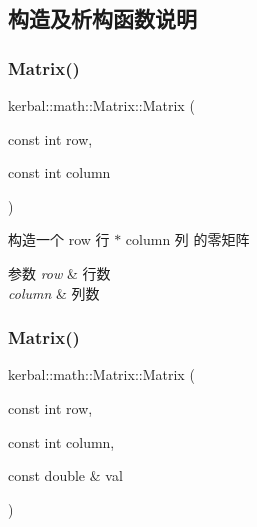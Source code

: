 \subsection{构造及析构函数说明}
\mbox{\label{classkerbal_1_1math_1_1_matrix_a07582c4589d21d351350fce8459c10da}} 
\subsubsection{\texorpdfstring{Matrix()}{Matrix()}\hspace{0.1cm}{\footnotesize\ttfamily [1/2]}}
{\footnotesize\ttfamily kerbal\+::math\+::\+Matrix\+::\+Matrix (\begin{DoxyParamCaption}\item[{const int}]{row,  }\item[{const int}]{column }\end{DoxyParamCaption})}



构造一个 row 行 $\ast$ column 列 的零矩阵 


\begin{DoxyParams}{参数}
{\em row} & 行数 \\
\hline
{\em column} & 列数 \\
\hline
\end{DoxyParams}
\mbox{\label{classkerbal_1_1math_1_1_matrix_a17111be388a194c33c39946cb7548d79}} 
\subsubsection{\texorpdfstring{Matrix()}{Matrix()}\hspace{0.1cm}{\footnotesize\ttfamily [2/2]}}
{\footnotesize\ttfamily kerbal\+::math\+::\+Matrix\+::\+Matrix (\begin{DoxyParamCaption}\item[{const int}]{row,  }\item[{const int}]{column,  }\item[{const double \&}]{val }\end{DoxyParamCaption})}



